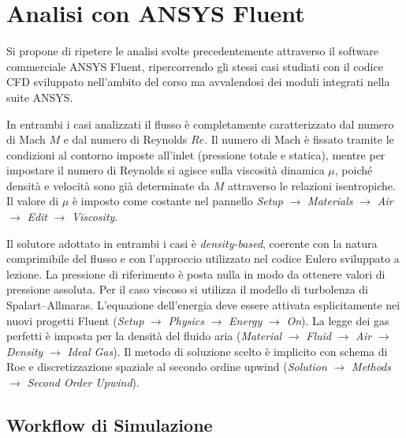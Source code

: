 
\chapter{Analisi con ANSYS Fluent}
\label{cap:fluent}

Si propone di ripetere le analisi svolte precedentemente attraverso il software
commerciale ANSYS Fluent, ripercorrendo gli stessi casi studiati con il codice
CFD sviluppato nell'ambito del corso ma avvalendosi dei moduli integrati nella
suite ANSYS.

In entrambi i casi analizzati il flusso è completamente caratterizzato dal numero
di Mach $M$ e dal numero di Reynolds $Re$.
Il numero di Mach è fissato tramite le condizioni al contorno imposte all'inlet
(pressione totale e statica), mentre per impostare il numero di Reynolds si agisce
sulla viscosità dinamica $\mu$, poiché densità e velocità sono già determinate
da $M$ attraverso le relazioni isentropiche.
Il valore di $\mu$ è imposto come costante nel pannello
\textit{Setup} $\to$ \textit{Materials} $\to$ \textit{Air} $\to$
\textit{Edit} $\to$ \textit{Viscosity}.

Il solutore adottato in entrambi i casi è \textit{density-based}, coerente
con la natura comprimibile del flusso e con l'approccio utilizzato nel codice
Eulero sviluppato a lezione.
La pressione di riferimento è posta nulla in modo da ottenere valori di pressione
assoluta.
Per il caso viscoso si utilizza il modello di turbolenza di Spalart--Allmaras.
L'equazione dell'energia deve essere attivata esplicitamente nei nuovi progetti
Fluent (\textit{Setup} $\to$ \textit{Physics} $\to$ \textit{Energy} $\to$
\textit{On}).
La legge dei gas perfetti è imposta per la densità del fluido aria
(\textit{Material} $\to$ \textit{Fluid} $\to$ \textit{Air} $\to$
\textit{Density} $\to$ \textit{Ideal Gas}).
Il metodo di soluzione scelto è implicito con schema di Roe e discretizzazione
spaziale al secondo ordine upwind (\textit{Solution} $\to$ \textit{Methods}
$\to$ \textit{Second Order Upwind}).

\section{Workflow di Simulazione}
\label{sec:fluent_workflow}

